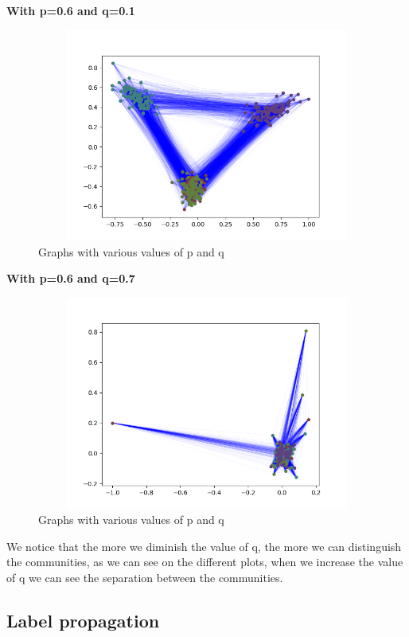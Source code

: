 \documentclass{article}
\begin{document}
\textbf{With p=0.6 and q=0.1}
\begin{figure}[h!]
\includegraphics[width=12cm, height=7cm]{Figure_2.png}
  \caption{Graphs with various values of p and q}
\end{figure}
\FloatBarrier

\textbf{With p=0.6 and q=0.7}
\begin{figure}[h!]
\includegraphics[width=12cm, height=7cm]{Figure_3.png}
  \caption{Graphs with various values of p and q}
\end{figure}
\FloatBarrier

We notice that the more we diminish the value of q, the more we can distinguish the communities, as we can see on the different plots, when we increase the value of q we can see the separation between the communities.

\clearpage

\subsection{Label propagation}
\end{document}
